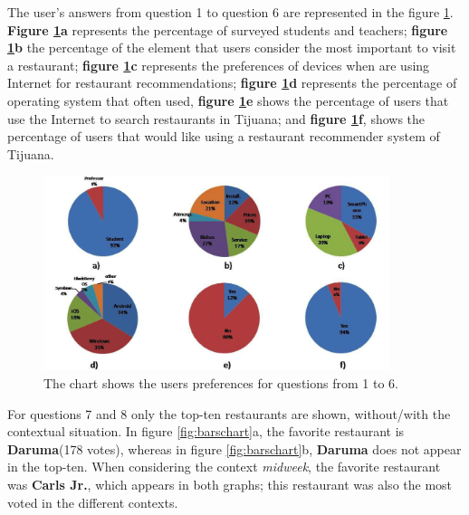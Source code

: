 The user's answers from question 1 to question 6 are represented in
the figure \ref{fig:cakeschart}. \textbf{Figure \ref{fig:cakeschart}a}
represents the percentage of surveyed students and teachers;
\textbf{figure \ref{fig:cakeschart}b}  the percentage of the element
that users consider the most important to visit a restaurant;
\textbf{figure \ref{fig:cakeschart}c} represents the preferences of
devices when are using Internet for restaurant recommendations;
\textbf{figure \ref{fig:cakeschart}d} represents the percentage of
operating system that often used, \textbf{figure
\ref{fig:cakeschart}e} shows the percentage of users that use the
Internet to search restaurants in Tijuana; and \textbf{figure
\ref{fig:cakeschart}f}, shows the percentage of users that would like
using a restaurant recommender system of Tijuana.
\begin{figure}
\captionsetup{justification=centering,margin=2cm,font=footnotesize}
\centering
\setlength\fboxsep{0pt}
\includegraphics[width=0.9\textwidth]{img/cakes.png}
\caption{The chart shows the users preferences for questions from 1 to 6.}
\label{fig:cakeschart}     
\end{figure}
For questions 7 and 8 only the top-ten restaurants are shown,
without/with the contextual situation. In figure \ref{fig:barschart}a,
the favorite restaurant is \textbf{Daruma}(178 votes),  whereas in
figure \ref{fig:barschart}b, \textbf{Daruma} does not appear in the
top-ten. When considering the context \textit{midweek}, the favorite
restaurant was \textbf{Carls Jr.}, which appears in both graphs; this
restaurant was also the most voted in the different contexts.
